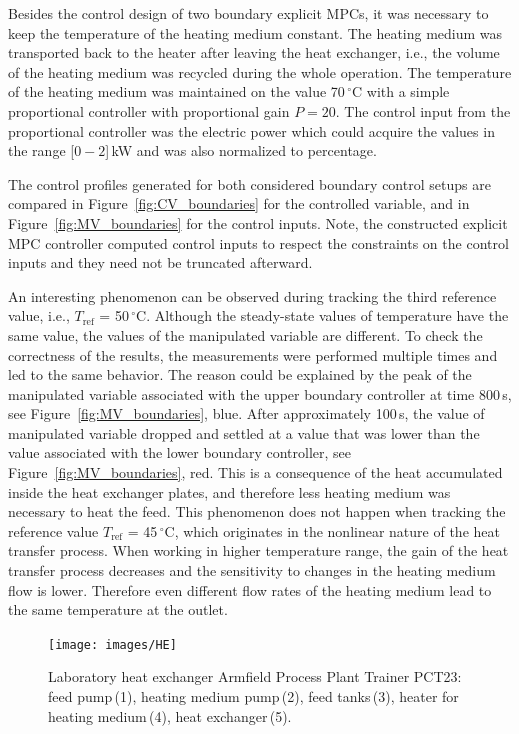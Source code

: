 \documentclass[preprint,12pt]{elsarticle}
\begin{document}
Besides the control design of two boundary explicit MPCs, it was necessary to keep the temperature of the heating medium constant. The heating medium was transported back to the heater after leaving the heat exchanger, i.e., the volume of the heating medium was recycled during the whole operation. The temperature of the heating medium was maintained on the value 70\,$^{\circ}\mathrm{C}$ with a simple proportional controller with proportional gain $P = 20$. The control input from the proportional controller was the electric power which could acquire the values in the range [$0-2$]\,kW and was also normalized to percentage.

The control profiles generated for both considered boundary control setups are compared in Figure~\ref{fig:CV_boundaries} for the controlled variable, and in Figure~\ref{fig:MV_boundaries} for the control inputs. 
Note, the constructed explicit MPC controller computed control inputs to respect the constraints on the control inputs and they need not be truncated afterward. 

An interesting phenomenon can be observed during tracking the third reference value, i.e., $T_{\mathrm{ref}}$ = 50\,$^{\circ}\mathrm{C}$. Although the steady-state values of temperature have the same value, the values of the manipulated variable are different. To check the correctness of the results, the measurements were performed multiple times and led to the same behavior. The reason could be explained by the peak of the manipulated variable associated with the upper boundary controller at time 800\,s, see Figure~\ref{fig:MV_boundaries}, blue. After approximately 100\,s, the value of manipulated variable dropped and settled at a value that was lower than the value associated with the lower boundary controller, see Figure~\ref{fig:MV_boundaries}, red. This is a consequence of the heat accumulated inside the heat exchanger plates, and therefore less heating medium was necessary to heat the feed. This phenomenon does not happen when tracking the reference value $T_{\mathrm{ref}}$ = 45\,$^{\circ}\mathrm{C}$, which originates in the nonlinear nature of the heat transfer process. When working in higher temperature range, the gain of the heat transfer process decreases and the sensitivity to changes in the heating medium flow is lower. Therefore even different flow rates of the heating medium lead to the same temperature at the outlet. 		

\begin{figure}
	\begin{center}
		\texttt{[image: images/HE]}
		\caption[Heat exchanger Armfield Process Plant Trainer PCT23]{Laboratory heat exchanger Armfield Process Plant Trainer PCT23: feed pump\,(1), heating medium pump\,(2), feed tanks\,(3), heater for heating medium\,(4), heat exchanger\,(5).}
		\label{fig:HE}
	\end{center}
\end{figure}
\end{document}
